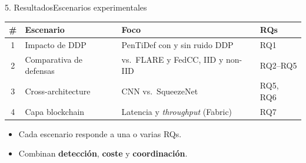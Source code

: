\begin{frame}{5. Resultados}{Escenarios experimentales}
  \begin{center}
  \small
  \begin{tabular}{@{}clll@{}}
    \toprule
    \textbf{\#} & \textbf{Escenario} & \textbf{Foco} & \textbf{RQs} \\
    \midrule
    1 & Impacto de DDP           & PenTiDef con y sin ruido DDP            & RQ1 \\
    2 & Comparativa de defensas  & vs.\ FLARE y FedCC, IID y non-IID       & RQ2--RQ5 \\
    3 & Cross-architecture       & CNN vs.\ SqueezeNet                     & RQ5, RQ6 \\
    4 & Capa blockchain          & Latencia y \textit{throughput} (Fabric) & RQ7 \\
    \bottomrule
  \end{tabular}
  \end{center}
  \vfill
  \begin{itemize}\small
    \item Cada escenario responde a una o varias RQs.
    \item Combinan \textbf{detección}, \textbf{coste} y \textbf{coordinación}.
  \end{itemize}
\end{frame}

